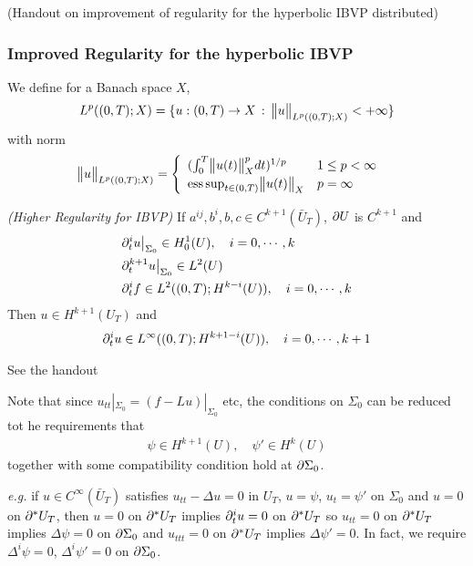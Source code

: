 \documentclass[12pt,a4paper]{report}
\newenvironment{proof}
{\begin{changemargin}{1cm}{0.5cm} 
	}%
	{\end{changemargin}
}
\begin{document}
(Handout on improvement of regularity for the hyperbolic IBVP distributed)

\subsubsection*{Improved Regularity for the hyperbolic IBVP}

We define for a Banach space $X$,
\begin{align*}
L^p((0,T); X) = \{ u : (0,T) \rightarrow X \,:\, \bigl\lVert u\bigr\rVert_{L^p((0,T);X)} < +\infty \}
\end{align*}
with norm
\begin{align*}
\bigl\lVert u\bigr\rVert_{L^p((0,T);X)} = \begin{cases}
\begin{array}{ll}
(\int_0^T \bigl\lVert u(t)\bigr\rVert_{X}^p dt)^{1/p} & 1\leq p < \infty \\
\text{ess}\,\text{sup}_{t\in (0,T)} \bigl\lVert u(t)\bigr\rVert_{X} &  p = \infty
\end{array}
\end{cases}
\end{align*}
\s

\thm \emph{(Higher Regularity for IBVP)} If $a^{ij}, b^i, b, c\in C^{k+1}(\bar{U}_T)$, $\partial U$ is $C^{k+1}$ and 
\begin{align*}
& \partial^i_t u \big|_{\Sigma_0} \in H_0^1(U), \quad i=0, \cdots,k \\
& \partial_t^{k+1} u \big|_{\Sigma_0} \in L^2(U) \\
& \partial_t^i f \in L^2((0,T) ; H^{k-i}(U)), \quad i=0, \cdots, k
\end{align*}
Then $u\in H^{k+1}(U_T)$ and
\begin{align*}
\partial_t^i u \in L^{\infty}((0,T) ; H^{k+1-i}(U)), \quad i=0, \cdots, k+1
\end{align*}
\begin{proof}
\pf See the handout
\end{proof}
\s

Note that since $u_{tt}|_{\Sigma_0} = (f-Lu)|_{\Sigma_0}$ etc, the conditions on $\Sigma_0$ can be reduced tot he requirements that
\begin{align*}
\psi \in H^{k+1}(U), \quad \psi' \in H^k(U)
\end{align*}
together with some compatibility condition hold at $\partial \Sigma_0$.
\s

\textit{e.g.} if $u\in C^{\infty}(\bar{U}_T)$ satisfies $u_{tt} - \Delta u =0$ in $U_T$, $u=\psi$, $u_t = \psi'$ on $\Sigma_0$ and $u=0$ on $\partial^* U_T$, then $u=0$ on $\partial^* U_T$ implies $\partial_t^i u=0$ on $\partial^* U_T$ so $u_{tt} =0$ on $\partial^* U_T$ implies $\Delta \psi =0$ on $\partial \Sigma_0$ and $u_{ttt} =0$ on $\partial^* U_T$ implies $\Delta \psi' =0$. In fact, we require $\Delta^i \psi =0$, $\Delta^i \psi' =0$ on $\partial \Sigma_0$.
\s
\end{document}
